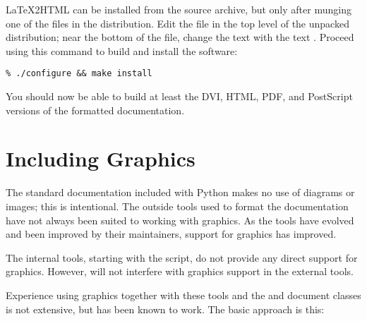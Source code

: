 \documentclass{howto}
\begin{document}
    \LaTeX2HTML can be installed from the source archive, but only
    after munging one of the files in the distribution.  Edit the file
     in the top level of the unpacked distribution;
    near the bottom of the file, change the text
     with the text .  Proceed
    using this command to build and install the software:

\begin{verbatim}
% ./configure && make install
\end{verbatim}

    You should now be able to build at least the DVI, HTML, PDF, and
    PostScript versions of the formatted documentation.


\section{Including Graphics \label{graphics}}

  The standard documentation included with Python makes no use of
  diagrams or images; this is intentional.  The outside tools used to
  format the documentation have not always been suited to working with
  graphics.  As the tools have evolved and been improved by their
  maintainers, support for graphics has improved.

  The internal tools, starting with the  script, do
  not provide any direct support for graphics.  However,
   will not interfere with graphics support in the
  external tools.

  Experience using graphics together with these tools and the
   and  document classes is not extensive,
  but has been known to work.  The basic approach is this:
\end{document}
